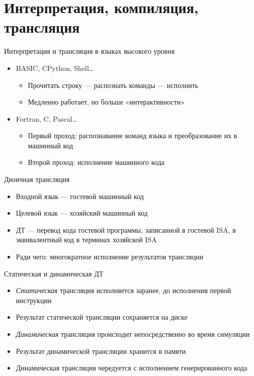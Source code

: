 \documentclass{beamer}
\begin{document}
\section{Интерпретация, компиляция, трансляция}

\begin{frame}{Интерпретация и трансляция в языках высокого уровня}
\begin{itemize}
\item BASIC, CPython, Shell\dots
    \begin{itemize}
    \item Прочитать строку — распознать команды — исполнить
    \item Медленно работает, но больше «интерактивности»
    \end{itemize}
\item Fortran, C, Pascal\dots
    \begin{itemize}
    \item Первый проход: распознавание команд языка и преобразование их в машинный код
    \item Второй проход: исполнение машинного кода
    \end{itemize}
\end{itemize}
\end{frame}

\begin{frame}{Двоичная трансляция}
\begin{itemize}
\item Входной язык — гостевой машинный код
\item Целевой язык — хозяйский машинный код
\item ДТ — перевод кода гостевой программы, записанной в гостевой ISA, в эквивалентный код в терминах хозяйской ISA
\item Ради чего: многократное исполнение результатов трансляции
\end{itemize}
\end{frame}

\begin{frame}{Статическая и динамическая ДТ}
\begin{itemize}
    \item \textit{Статическая} трансляция исполняется заранее, до исполнения первой инструкции
    \item Результат статической трансляции сохраняется на диске
    \item \textit{Динамическая} трансляция происходит непосредственно во время симуляции
    \item Результат динамической трансляции хранится в памяти
    \item Динамическая трансляция чередуется с исполнением генерированного кода
\end{itemize}

\end{frame}
\end{document}
